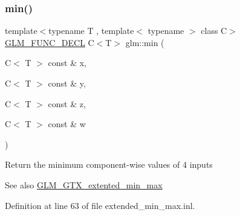 \subsubsection{\texorpdfstring{min()}{min()}\hspace{0.1cm}{\footnotesize\ttfamily [6/6]}}
{\footnotesize\ttfamily template$<$typename T , template$<$ typename $>$ class C$>$ \\
\mbox{\hyperlink{setup_8hpp_ab2d052de21a70539923e9bcbf6e83a51}{G\+L\+M\+\_\+\+F\+U\+N\+C\+\_\+\+D\+E\+CL}} C$<$T$>$ glm\+::min (\begin{DoxyParamCaption}\item[{C$<$ T $>$ const \&}]{x,  }\item[{C$<$ T $>$ const \&}]{y,  }\item[{C$<$ T $>$ const \&}]{z,  }\item[{C$<$ T $>$ const \&}]{w }\end{DoxyParamCaption})}

Return the minimum component-\/wise values of 4 inputs \begin{DoxySeeAlso}{See also}
\mbox{\hyperlink{group__gtx__extented__min__max}{G\+L\+M\+\_\+\+G\+T\+X\+\_\+extented\+\_\+min\+\_\+max}} 
\end{DoxySeeAlso}


Definition at line 63 of file extended\+\_\+min\+\_\+max.\+inl.

